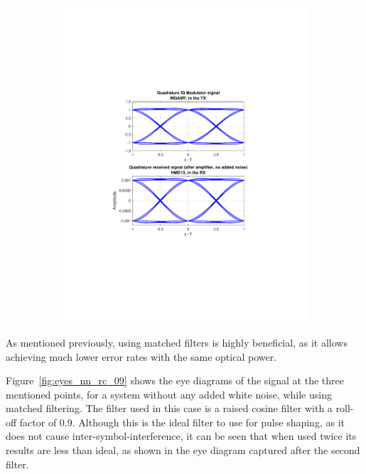 \begin{refsection}
\begin{figure}[H]
\begin{subfigure}{.5\textwidth}
		\includegraphics[clip, trim=4cm 7cm 4cm 7cm, width=\textwidth]{./sdf/m_qam_system/figures/eyes/simulRc09Sp60Np00NoMF_q.pdf}
	\end{subfigure}
	\caption{\label{fig:eyespower}}
\end{figure}

As mentioned previously, using matched filters is highly beneficial, as it
allows achieving much lower error rates with the same optical power.

Figure~\ref{fig:eyes_nn_rc_09} shows the eye diagrams of the signal at the
three mentioned points, for a system without any added white noise, while using
matched filtering. The filter used in this case is a raised cosine filter with
a roll-off factor of 0.9. Although this is the ideal filter to use for pulse
shaping, as it does not cause inter-symbol-interference, it can be seen that
when used twice its results are less than ideal, as shown in the eye diagram
captured after the second filter.
\begin{table}[H]
	\centering
	

\end{table}
\end{refsection}
